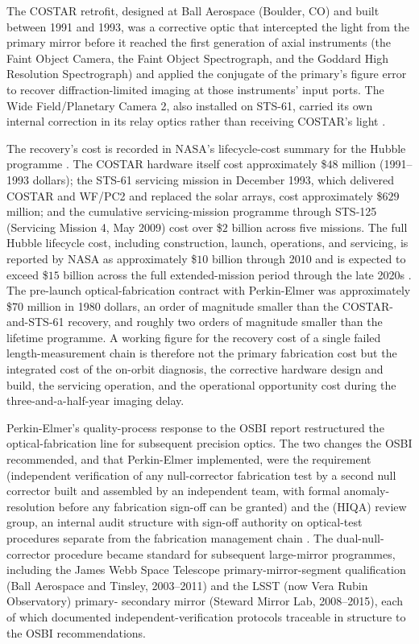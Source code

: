 The COSTAR retrofit, designed at Ball Aerospace (Boulder, CO) and
built between 1991 and 1993, was a corrective optic that intercepted
the light from the primary mirror before it reached the first
generation of axial instruments (the Faint Object Camera, the Faint
Object Spectrograph, and the Goddard High Resolution Spectrograph)
and applied the conjugate of the primary's figure error to recover
diffraction-limited imaging at those instruments' input ports. The
Wide Field/Planetary Camera 2, also installed on STS-61, carried
its own internal correction in its relay optics rather than
receiving COSTAR's light \cite{ch07t3-text:chaisson-hubble-wars-1994}.

The recovery's cost is recorded in NASA's lifecycle-cost summary
for the Hubble programme \cite{ch07t3-web:nasa-hubble-program-cost-2010}.
The COSTAR hardware itself cost approximately \$$48$ million
(1991--1993 dollars); the STS-61 servicing mission in December
1993, which delivered COSTAR and WF/PC2 and replaced the solar
arrays, cost approximately \$$629$ million; and the cumulative
servicing-mission programme through STS-125 (Servicing Mission 4,
May 2009) cost over \$$2$ billion across five missions. The full
Hubble lifecycle cost, including construction, launch, operations,
and servicing, is reported by NASA as approximately \$$10$ billion
through 2010 and is expected to exceed \$$15$ billion across the
full extended-mission period through the late 2020s
\cite{ch07t3-web:nasa-hubble-program-cost-2010}. The pre-launch
optical-fabrication contract with Perkin-Elmer was approximately
\$$70$ million in 1980 dollars, an order of magnitude smaller than
the COSTAR-and-STS-61 recovery, and roughly two orders of magnitude
smaller than the lifetime programme. A working figure for the
recovery cost of a single failed length-measurement chain is
therefore not the primary fabrication cost but the integrated cost
of the on-orbit diagnosis, the corrective hardware design and
build, the servicing operation, and the operational opportunity
cost during the three-and-a-half-year imaging delay.

Perkin-Elmer's quality-process response to the OSBI report
restructured the optical-fabrication line for subsequent precision
optics. The two changes the OSBI recommended, and that Perkin-Elmer
implemented, were the 
requirement (independent verification of any null-corrector
fabrication test by a second null corrector built and assembled by
an independent team, with formal anomaly-resolution before any
fabrication sign-off can be granted) and the  (HIQA) review group, an internal
audit structure with sign-off authority on optical-test procedures
separate from the fabrication management chain
\cite{acc:nasa-hubble-optical-systems-1990,ch07t3-text:chaisson-hubble-wars-1994}.
The dual-null-corrector procedure became standard for subsequent
large-mirror programmes, including the James Webb Space Telescope
primary-mirror-segment qualification (Ball Aerospace and Tinsley,
2003--2011) and the LSST (now Vera Rubin Observatory) primary-
secondary mirror (Steward Mirror Lab, 2008--2015), each of which
documented independent-verification protocols traceable in
structure to the OSBI recommendations.

